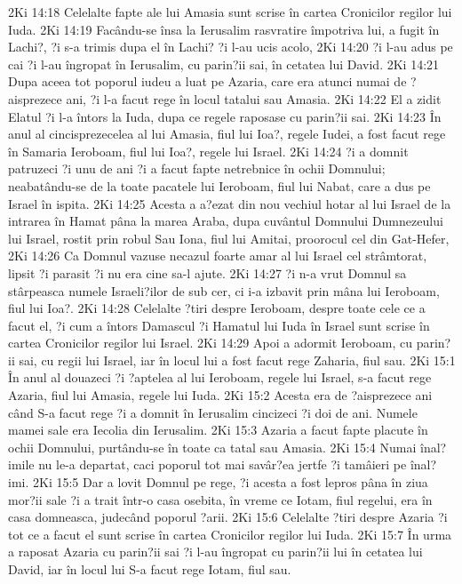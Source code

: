 2Ki 14:18  Celelalte fapte ale lui Amasia sunt scrise în cartea Cronicilor regilor lui Iuda.
2Ki 14:19  Facându-se însa la Ierusalim rasvratire împotriva lui, a fugit în Lachi?, ?i s-a trimis dupa el în Lachi? ?i l-au ucis acolo,
2Ki 14:20  ?i l-au adus pe cai ?i l-au îngropat în Ierusalim, cu parin?ii sai, în cetatea lui David.
2Ki 14:21  Dupa aceea tot poporul iudeu a luat pe Azaria, care era atunci numai de ?aisprezece ani, ?i l-a facut rege în locul tatalui sau Amasia.
2Ki 14:22  El a zidit Elatul ?i l-a întors la Iuda, dupa ce regele raposase cu parin?ii sai.
2Ki 14:23  În anul al cincisprezecelea al lui Amasia, fiul lui Ioa?, regele Iudei, a fost facut rege în Samaria Ieroboam, fiul lui Ioa?, regele lui Israel.
2Ki 14:24  ?i a domnit patruzeci ?i unu de ani ?i a facut fapte netrebnice în ochii Domnului; neabatându-se de la toate pacatele lui Ieroboam, fiul lui Nabat, care a dus pe Israel în ispita.
2Ki 14:25  Acesta a a?ezat din nou vechiul hotar al lui Israel de la intrarea în Hamat pâna la marea Araba, dupa cuvântul Domnului Dumnezeului lui Israel, rostit prin robul Sau Iona, fiul lui Amitai, proorocul cel din Gat-Hefer,
2Ki 14:26  Ca Domnul vazuse necazul foarte amar al lui Israel cel strâmtorat, lipsit ?i parasit ?i nu era cine sa-l ajute.
2Ki 14:27  ?i n-a vrut Domnul sa stârpeasca numele Israeli?ilor de sub cer, ci i-a izbavit prin mâna lui Ieroboam, fiul lui Ioa?.
2Ki 14:28  Celelalte ?tiri despre Ieroboam, despre toate cele ce a facut el, ?i cum a întors Damascul ?i Hamatul lui Iuda în Israel sunt scrise în cartea Cronicilor regilor lui Israel.
2Ki 14:29  Apoi a adormit Ieroboam, cu parin?ii sai, cu regii lui Israel, iar în locul lui a fost facut rege Zaharia, fiul sau.
2Ki 15:1  În anul al douazeci ?i ?aptelea al lui Ieroboam, regele lui Israel, s-a facut rege Azaria, fiul lui Amasia, regele lui Iuda.
2Ki 15:2  Acesta era de ?aisprezece ani când S-a facut rege ?i a domnit în Ierusalim cincizeci ?i doi de ani. Numele mamei sale era Iecolia din Ierusalim.
2Ki 15:3  Azaria a facut fapte placute în ochii Domnului, purtându-se în toate ca tatal sau Amasia.
2Ki 15:4  Numai înal?imile nu le-a departat, caci poporul tot mai savâr?ea jertfe ?i tamâieri pe înal?imi.
2Ki 15:5  Dar a lovit Domnul pe rege, ?i acesta a fost lepros pâna în ziua mor?ii sale ?i a trait într-o casa osebita, în vreme ce Iotam, fiul regelui, era în casa domneasca, judecând poporul ?arii.
2Ki 15:6  Celelalte ?tiri despre Azaria ?i tot ce a facut el sunt scrise în cartea Cronicilor regilor lui Iuda.
2Ki 15:7  În urma a raposat Azaria cu parin?ii sai ?i l-au îngropat cu parin?ii lui în cetatea lui David, iar în locul lui S-a facut rege Iotam, fiul sau.
